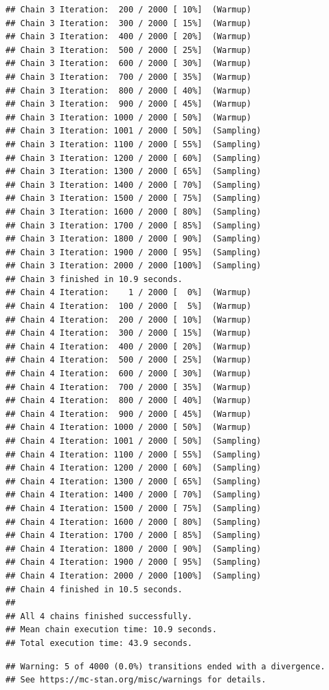 \documentclass[
]{article}
\begin{document}
\begin{verbatim}
## Chain 3 Iteration:  200 / 2000 [ 10%]  (Warmup) 
## Chain 3 Iteration:  300 / 2000 [ 15%]  (Warmup) 
## Chain 3 Iteration:  400 / 2000 [ 20%]  (Warmup) 
## Chain 3 Iteration:  500 / 2000 [ 25%]  (Warmup) 
## Chain 3 Iteration:  600 / 2000 [ 30%]  (Warmup) 
## Chain 3 Iteration:  700 / 2000 [ 35%]  (Warmup) 
## Chain 3 Iteration:  800 / 2000 [ 40%]  (Warmup) 
## Chain 3 Iteration:  900 / 2000 [ 45%]  (Warmup) 
## Chain 3 Iteration: 1000 / 2000 [ 50%]  (Warmup) 
## Chain 3 Iteration: 1001 / 2000 [ 50%]  (Sampling) 
## Chain 3 Iteration: 1100 / 2000 [ 55%]  (Sampling) 
## Chain 3 Iteration: 1200 / 2000 [ 60%]  (Sampling) 
## Chain 3 Iteration: 1300 / 2000 [ 65%]  (Sampling) 
## Chain 3 Iteration: 1400 / 2000 [ 70%]  (Sampling) 
## Chain 3 Iteration: 1500 / 2000 [ 75%]  (Sampling) 
## Chain 3 Iteration: 1600 / 2000 [ 80%]  (Sampling) 
## Chain 3 Iteration: 1700 / 2000 [ 85%]  (Sampling) 
## Chain 3 Iteration: 1800 / 2000 [ 90%]  (Sampling) 
## Chain 3 Iteration: 1900 / 2000 [ 95%]  (Sampling) 
## Chain 3 Iteration: 2000 / 2000 [100%]  (Sampling) 
## Chain 3 finished in 10.9 seconds.
## Chain 4 Iteration:    1 / 2000 [  0%]  (Warmup) 
## Chain 4 Iteration:  100 / 2000 [  5%]  (Warmup) 
## Chain 4 Iteration:  200 / 2000 [ 10%]  (Warmup) 
## Chain 4 Iteration:  300 / 2000 [ 15%]  (Warmup) 
## Chain 4 Iteration:  400 / 2000 [ 20%]  (Warmup) 
## Chain 4 Iteration:  500 / 2000 [ 25%]  (Warmup) 
## Chain 4 Iteration:  600 / 2000 [ 30%]  (Warmup) 
## Chain 4 Iteration:  700 / 2000 [ 35%]  (Warmup) 
## Chain 4 Iteration:  800 / 2000 [ 40%]  (Warmup) 
## Chain 4 Iteration:  900 / 2000 [ 45%]  (Warmup) 
## Chain 4 Iteration: 1000 / 2000 [ 50%]  (Warmup) 
## Chain 4 Iteration: 1001 / 2000 [ 50%]  (Sampling) 
## Chain 4 Iteration: 1100 / 2000 [ 55%]  (Sampling) 
## Chain 4 Iteration: 1200 / 2000 [ 60%]  (Sampling) 
## Chain 4 Iteration: 1300 / 2000 [ 65%]  (Sampling) 
## Chain 4 Iteration: 1400 / 2000 [ 70%]  (Sampling) 
## Chain 4 Iteration: 1500 / 2000 [ 75%]  (Sampling) 
## Chain 4 Iteration: 1600 / 2000 [ 80%]  (Sampling) 
## Chain 4 Iteration: 1700 / 2000 [ 85%]  (Sampling) 
## Chain 4 Iteration: 1800 / 2000 [ 90%]  (Sampling) 
## Chain 4 Iteration: 1900 / 2000 [ 95%]  (Sampling) 
## Chain 4 Iteration: 2000 / 2000 [100%]  (Sampling) 
## Chain 4 finished in 10.5 seconds.
## 
## All 4 chains finished successfully.
## Mean chain execution time: 10.9 seconds.
## Total execution time: 43.9 seconds.
\end{verbatim}

\begin{verbatim}
## Warning: 5 of 4000 (0.0%) transitions ended with a divergence.
## See https://mc-stan.org/misc/warnings for details.
\end{verbatim}
\end{document}
